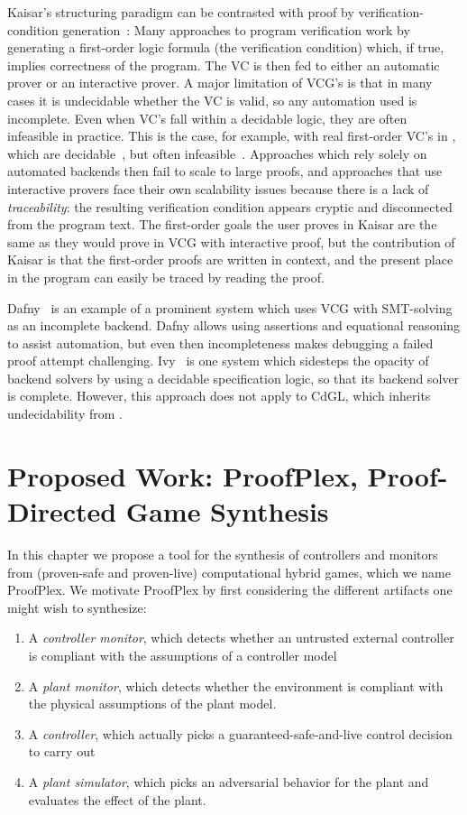 \documentclass[12pt]{cmuthesis}
\theoremstyle{definition}
\theoremstyle{remark}
\newcommand{\CdGL}{\textsf{CdGL}\xspace}
\newcommand{\ProofPlex}{ProofPlex\xspace}
\begin{document}
Kaisar's structuring paradigm can be contrasted with proof by verification-condition generation~\cite{DBLP:conf/ifip/King71}: Many approaches to program verification work by generating a first-order logic formula (the verification condition) which, if true, implies correctness of the program.
The VC is then fed to either an automatic prover or an interactive prover.
A major limitation of VCG's is that in many cases it is undecidable whether the VC is valid, so any automation used is incomplete.
Even when VC's fall within a decidable logic, they are often infeasible in practice.
This is the case, for example, with real first-order VC's in \dL, which are decidable~\cite{Tarski}, but often infeasible~\cite{Davenport1988,DBLP:journals/aaecc/Weispfenning97}.
Approaches which rely solely on automated backends then fail to scale to large proofs, and approaches that use interactive provers face their own scalability issues because there is a lack of \emph{traceability}: the resulting verification condition appears cryptic and disconnected from the program text.
The first-order goals the user proves in Kaisar are the same as they would prove in VCG with interactive proof, but the contribution of Kaisar is that the first-order proofs are written in context, and the present place in the program can easily be traced by reading the proof.

Dafny~\cite{DBLP:conf/lpar/Leino10} is an example of a prominent system which uses VCG with SMT-solving as an incomplete backend.
Dafny allows using assertions and equational reasoning to assist automation, but even then incompleteness makes debugging a failed proof attempt challenging.
Ivy~\cite{DBLP:conf/pldi/PadonMPSS16} is one system which sidesteps the opacity of backend solvers by using a decidable specification logic, so that its backend solver is complete.
However, this approach does not apply to \CdGL, which inherits undecidability from \dGL.

\chapter{Proposed Work: \ProofPlex, Proof-Directed Game Synthesis}
\label{ch:proofplex}
In this chapter we propose a tool for the synthesis of controllers and monitors from (proven-safe and proven-live) computational hybrid games, which we name \ProofPlex.
We motivate \ProofPlex by first considering the different artifacts one might wish to synthesize:
\begin{enumerate}
\item A \emph{controller monitor}, which detects whether an untrusted external controller is compliant with the assumptions of a controller model
\item A \emph{plant monitor}, which detects whether the environment is compliant with the physical assumptions of the plant model.
\item A \emph{controller}, which actually picks a guaranteed-safe-and-live control decision to carry out
\item A \emph{plant simulator}, which picks an adversarial behavior for the plant and evaluates the effect of the plant.
\end{enumerate}
\end{document}
